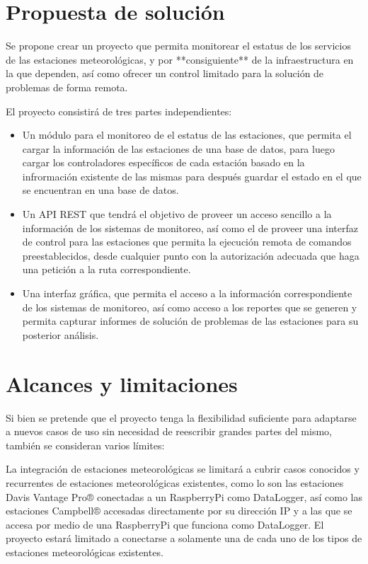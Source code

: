 \section{Propuesta de solución}

Se propone crear un proyecto que permita monitorear el estatus de los servicios de las estaciones meteorológicas, y por **consiguiente** de la infraestructura en la que dependen, así como ofrecer un control limitado para la solución de problemas de forma remota.

El proyecto consistirá de tres partes independientes:

\begin{itemize}
   \item Un módulo para el monitoreo de el estatus de las estaciones, que permita el cargar la información de las estaciones de una base de datos, para luego cargar los controladores específicos de cada estación basado en la infrormación existente de las mismas para después guardar el estado en el que se encuentran en una base de datos.

   \item Un API REST que tendrá el objetivo de proveer un acceso sencillo a la información de los sistemas de monitoreo, así como el de proveer una interfaz de control para las estaciones que permita la ejecución remota de comandos preestablecidos, desde cualquier punto con la autorización adecuada que haga una petición a la ruta correspondiente.

   \item Una interfaz gráfica, que permita el acceso a la información correspondiente de los sistemas de monitoreo, así como acceso a los reportes que se generen y permita capturar informes de solución de problemas de las estaciones para su posterior análisis.

\end{itemize}

\section{Alcances y limitaciones}

Si bien se pretende que el proyecto tenga la flexibilidad suficiente para adaptarse a nuevos casos de uso sin necesidad de reescribir grandes partes del mismo, también se consideran varios límites:

La integración de estaciones meteorológicas se limitará a cubrir casos conocidos y recurrentes de estaciones meteorológicas existentes, como lo son las estaciones Davis Vantage Pro® conectadas a un RaspberryPi como DataLogger, así como las estaciones Campbell® accesadas directamente por su dirección IP y a las que se accesa por medio de una RaspberryPi que funciona como DataLogger. El proyecto estará limitado a conectarse a solamente una de cada uno de los tipos de estaciones meteorológicas existentes.

